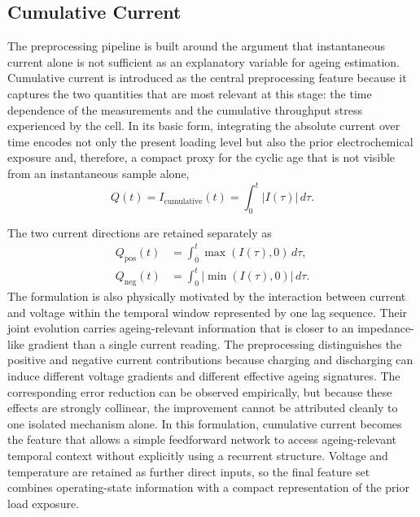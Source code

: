 \documentclass[
    a4paper,
    12pt,
    titlepage,
    bibliography=totoc,
    twoside=on,
    parskip=false,
    numbers=noenddot,
    cleardoublepage=empty,
    DIV=12,
    BCOR=12.0mm,
    headheight=36pt,
    headings=openright
]{scrreprt}
\begin{document}
\subsection{Cumulative Current}
The preprocessing pipeline is built around the argument that instantaneous current alone is not sufficient as an explanatory variable for ageing estimation. Cumulative current is introduced as the central preprocessing feature because it captures the two quantities that are most relevant at this stage: the time dependence of the measurements and the cumulative throughput stress experienced by the cell. In its basic form, integrating the absolute current over time encodes not only the present loading level but also the prior electrochemical exposure and, therefore, a compact proxy for the cyclic age that is not visible from an instantaneous sample alone,
\begin{equation}
Q(t) = I_{\mathrm{cumulative}}(t) = \int_{0}^{t} \lvert I(\tau) \rvert \, d\tau .
\end{equation}

The two current directions are retained separately as
\begin{equation}
\begin{aligned}
Q_{\mathrm{pos}}(t) &= \int_{0}^{t} \max\!\left(I(\tau),0\right) \, d\tau ,\\
Q_{\mathrm{neg}}(t) &= \int_{0}^{t} \left\lvert \min\!\left(I(\tau),0\right) \right\rvert \, d\tau .
\end{aligned}
\end{equation}
The formulation is also physically motivated by the interaction between current and voltage within the temporal window represented by one lag sequence. Their joint evolution carries ageing-relevant information that is closer to an impedance-like gradient than a single current reading. The preprocessing distinguishes the positive and negative current contributions because charging and discharging can induce different voltage gradients and different effective ageing signatures. The corresponding error reduction can be observed empirically, but because these effects are strongly collinear, the improvement cannot be attributed cleanly to one isolated mechanism alone. In this formulation, cumulative current becomes the feature that allows a simple feedforward network to access ageing-relevant temporal context without explicitly using a recurrent structure. Voltage and temperature are retained as further direct inputs, so the final feature set combines operating-state information with a compact representation of the prior load exposure.
\end{document}
